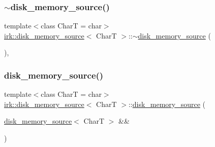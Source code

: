 \subsubsection{\texorpdfstring{$\sim$disk\+\_\+memory\+\_\+source()}{~disk\_memory\_source()}}
{\footnotesize\ttfamily template$<$class CharT  = char$>$ \\
\mbox{\hyperlink{classirk_1_1disk__memory__source}{irk\+::disk\+\_\+memory\+\_\+source}}$<$ CharT $>$\+::$\sim$\mbox{\hyperlink{classirk_1_1disk__memory__source}{disk\+\_\+memory\+\_\+source}} (\begin{DoxyParamCaption}{ }\end{DoxyParamCaption})\hspace{0.3cm}{\ttfamily [default]}, {\ttfamily [noexcept]}}

\mbox{\label{classirk_1_1disk__memory__source_aafd940f79556fbd391fe60f3e0cbdf84}} 
\subsubsection{\texorpdfstring{disk\+\_\+memory\+\_\+source()}{disk\_memory\_source()}\hspace{0.1cm}{\footnotesize\ttfamily [3/5]}}
{\footnotesize\ttfamily template$<$class CharT  = char$>$ \\
\mbox{\hyperlink{classirk_1_1disk__memory__source}{irk\+::disk\+\_\+memory\+\_\+source}}$<$ CharT $>$\+::\mbox{\hyperlink{classirk_1_1disk__memory__source}{disk\+\_\+memory\+\_\+source}} (\begin{DoxyParamCaption}\item[{\mbox{\hyperlink{classirk_1_1disk__memory__source}{disk\+\_\+memory\+\_\+source}}$<$ CharT $>$ \&\&}]{ }\end{DoxyParamCaption})\hspace{0.3cm}{\ttfamily [default]}}

\mbox{\label{classirk_1_1disk__memory__source_af1ffaac873ff29803fca78d3446df4e0}} 
